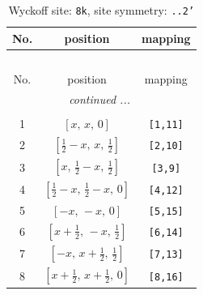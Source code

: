 \documentclass[fleqn,8pt]{jsarticle}
\begin{document}
\begin{longtable}{ccc}
\caption{Wyckoff site: {\tt 8k}, site symmetry: {\tt ..2'}}
 \\
 \hline \hline
No. & position & mapping \\ \hline \endfirsthead

\multicolumn{2}{l}{\tablename\ \thetable{}} \\
 \hline \hline
No. & position & mapping \\ \hline \endhead

 \hline \hline
\multicolumn{2}{r}{\footnotesize\it continued ...} \\ \endfoot

 \hline \hline
\multicolumn{2}{r}{} \\ \endlastfoot

1 & $\left[ x,\, x,\, 0 \right]$ & {\tt [1,11]} \\ \hline
2 & $\left[ \frac{1}{2} - x,\, x,\, \frac{1}{2} \right]$ & {\tt [2,10]} \\ \hline
3 & $\left[ x,\, \frac{1}{2} - x,\, \frac{1}{2} \right]$ & {\tt [3,9]} \\ \hline
4 & $\left[ \frac{1}{2} - x,\, \frac{1}{2} - x,\, 0 \right]$ & {\tt [4,12]} \\ \hline
5 & $\left[ - x,\, - x,\, 0 \right]$ & {\tt [5,15]} \\ \hline
6 & $\left[ x + \frac{1}{2},\, - x,\, \frac{1}{2} \right]$ & {\tt [6,14]} \\ \hline
7 & $\left[ - x,\, x + \frac{1}{2},\, \frac{1}{2} \right]$ & {\tt [7,13]} \\ \hline
8 & $\left[ x + \frac{1}{2},\, x + \frac{1}{2},\, 0 \right]$ & {\tt [8,16]} \\
\end{longtable}
\renewcommand{\arraystretch}{1.2}
\end{document}
